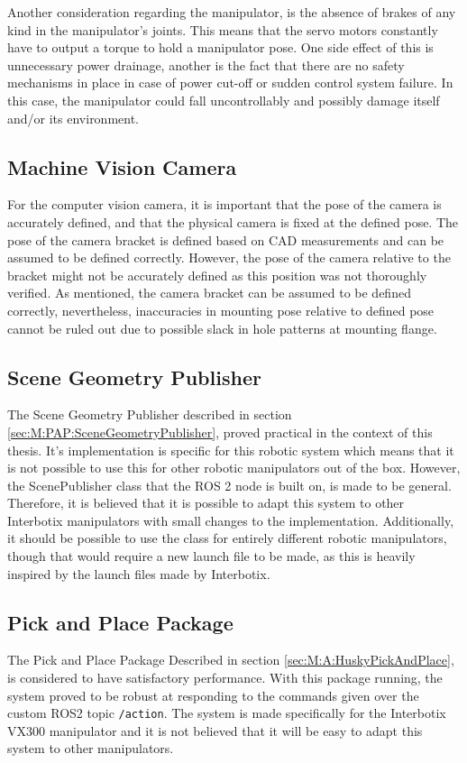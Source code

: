 Another consideration regarding the manipulator, is the absence of brakes of any kind in the manipulator's joints. This means that the servo motors constantly have to output a torque to hold a manipulator pose. One side effect of this is unnecessary power drainage, another is the fact that there are no safety mechanisms in place in case of power cut-off or sudden control system failure. In this case, the manipulator could fall uncontrollably and possibly damage itself and/or its environment.

\subsection{Machine Vision Camera}\label{sec:D:PAP:ManipulatorMountedCamera}
For the computer vision camera, it is important that the pose of the camera is accurately defined, and that the physical camera is fixed at the defined pose. The pose of the camera bracket is defined based on CAD measurements and can be assumed to be defined correctly. However, the pose of the camera relative to the bracket might not be accurately defined as this position was not thoroughly verified. As mentioned, the camera bracket can be assumed to be defined correctly, nevertheless, inaccuracies in mounting pose relative to defined pose cannot be ruled out due to possible slack in hole patterns at mounting flange.

\subsection{Scene Geometry Publisher}
The Scene Geometry Publisher described in section \ref{sec:M:PAP:SceneGeometryPublisher}, proved practical in the context of this thesis. It's implementation is specific for this robotic system which means that it is not possible to use this for other robotic manipulators out of the box. However, the ScenePublisher class that the ROS 2 node is built on, is made to be general. Therefore, it is believed that it is possible to adapt this system to other Interbotix manipulators with small changes to the implementation. Additionally, it should be possible to use the class for entirely different robotic manipulators, though that would require a new launch file to be made, as this is heavily inspired by the launch files made by Interbotix.

\subsection{Pick and Place Package}
The Pick and Place Package Described in section \ref{sec:M:A:HuskyPickAndPlace}, is considered to have satisfactory performance. With this package running, the system proved to be robust at responding to the commands given over the custom ROS2 topic \lstinline{/action}. The system is made specifically for the Interbotix VX300 manipulator and it is not believed that it will be easy to adapt this system to other manipulators. 

